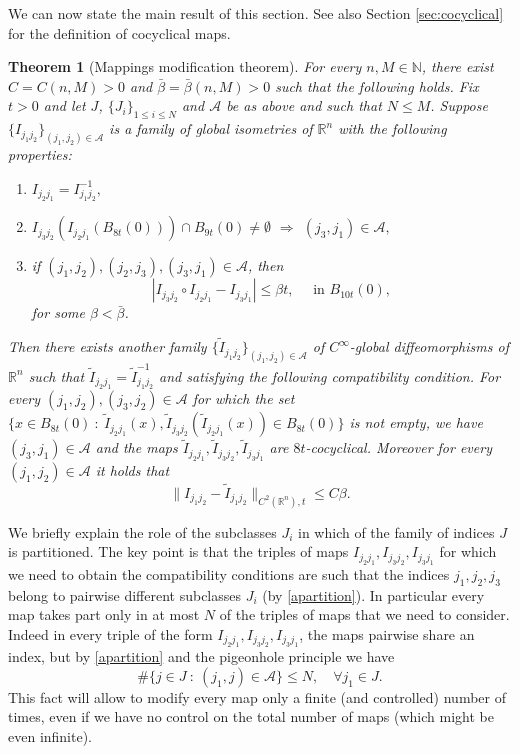 \documentclass[11pt]{article}
\newcommand{\rr}{\mathbb{R}}
\theoremstyle{plain}
\newtheorem{theorem}{Theorem}[section]
\theoremstyle{definition}
\numberwithin{equation}{section}
\begin{document}
We can now state the main result of this section. See also Section \ref{sec:cocyclical} for the definition of cocyclical maps.
\begin{theorem}[Mappings modification theorem]\label{bigmodification2}
	For every $n,M \in \mathbb{N}$, there exist $C=C(n,M)>0$ and $\bar \beta=\bar \beta(n,M)>0$ such that the following holds. Fix $t>0$  and let $J$, $\{J_{i}\}_{1\le i\le N}$ and $\mathcal{A}$ be as above and such that $N\le M$. Suppose $\{I_{j_1j_2}\}_{(j_1,j_2)\in \mathcal{A}}$ is a family of global isometries of $\rr^n$ with the following properties:
	
	\begin{enumerate}[label=\text{\Alph*)}]
		\item \label{A)} $I_{j_2j_1}=I_{j_1j_2}^{-1},$
		\item \label{B)} $I_{j_3j_2}(I_{j_2j_1}(B_{8t}(0)))\cap B_{9t}(0)\neq \emptyset $ $\Longrightarrow$ $(j_3,j_1)\in \mathcal{A},$
		\item \label{C)} if $(j_1,j_2),(j_2,j_3),(j_3,j_1)\in \mathcal{A}$, then
		\begin{equation}\label{eq:assumption C}
			|I_{j_3j_2}\circ I_{j_2j_1}-I_{j_3j_1}|\le  \beta t, \quad \text{ in $B_{10t}(0),$}
		\end{equation}
		for some $\beta<\bar \beta$. 
	\end{enumerate}
	Then there exists another family $\{\widetilde I_{j_1j_2}\}_{(j_1,j_2)\in \mathcal{A}}$ of $C^\infty$-global diffeomorphisms of $\rr^n$ such that	$\widetilde I_{j_2j_1}=\widetilde I_{j_1j_2}^{-1}$ and satisfying the following compatibility condition.  For every $(j_1,j_2),(j_3,j_2)\in \mathcal{A}$ for which the set  $\{x \in B_{8t}(0) \ : \  \tilde I_{j_2j_1}(x),\tilde I_{j_3j_2}(\tilde I_{j_2j_1}(x))\in B_{8t}(0)\}$ is not empty, we have $(j_3,j_1)\in \mathcal{A}$ and  the maps $\tilde I_{j_2j_1},\tilde I_{j_3j_2},\tilde I_{j_3j_1}$ are $8t$-cocyclical.
	Moreover for every $(j_1,j_2)\in \mathcal{A}$ it holds that
	\begin{equation}\label{finalb2}
		\|I_{j_1j_2}-\widetilde I_{j_1j_2} \|_{C^2(\rr^n),t}\le C \beta.
	\end{equation}
\end{theorem}
We briefly explain the role of the subclasses $J_i$ in which of the family of indices $J$ is partitioned.  The key point is that the triples of maps $I_{j_2j_1}, I_{j_3j_2}, I_{j_3j_1}$ for which we need to obtain the compatibility conditions are such that the indices $j_1,j_2,j_3$ belong to pairwise different  subclasses $J_i$  (by \eqref{apartition}). In particular every map takes part only in at most $N$ of the triples of maps that we need to consider. Indeed in every triple of the form $I_{j_2j_1}, I_{j_3j_2}, I_{j_3j_1}$, the maps pairwise share an index, but
by \eqref{apartition} and the pigeonhole principle we have
\begin{equation}\label{eq:pigeon}
    \# \{j \in J \ : \  (j_1,j)\in \mathcal A\}\le N, \quad \forall j_1\in J.
\end{equation}
This fact will allow to modify every map only a finite (and controlled) number of times, even if we have no control on the total number of maps (which might be even infinite).
\end{document}
